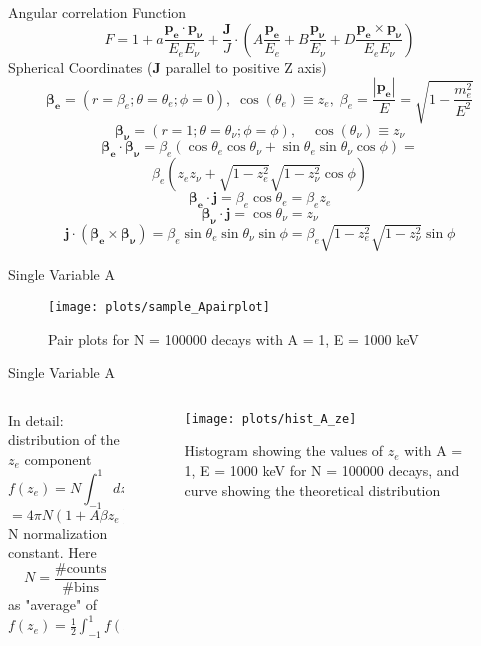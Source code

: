 \documentclass{beamer}
\begin{document}
\begin{frame}{Angular correlation Function}
	$$F = 1 + a \frac{\boldsymbol{p_e}\cdot\boldsymbol{p_\nu}}{E_eE_\nu} + \frac{\boldsymbol{J}}J\cdot\left(A \frac{\boldsymbol{p_e}}{E_e} + B \frac{\boldsymbol{p_\nu}}{E_\nu} + D \frac{\boldsymbol{p_e}\times\boldsymbol{p_\nu}}{E_eE_\nu}\right)$$
	Spherical Coordinates ($\boldsymbol{J}$ parallel to positive Z axis)
	$$\boldsymbol{\beta_e} = (r=\beta_e;\theta=\theta_e;\phi=0),\;\cos(\theta_e) \equiv z_e,\;\beta_e = \frac{|\boldsymbol{p_e}|}{E} = \sqrt{1-\frac{m_e^2}{E^2}}$$
	$$\boldsymbol{\beta_\nu} = (r=1;\theta=\theta_\nu;\phi=\phi),\quad\cos(\theta_\nu) \equiv z_\nu$$
	$$\boldsymbol{\beta_e}\cdot\boldsymbol{\beta_\nu} = \beta_e(\cos\theta_e\cos\theta_\nu + \sin\theta_e\sin\theta_\nu\cos\phi) =$$
	$$ \beta_e(z_ez_\nu + \sqrt{1-z^2_e}\sqrt{1-z^2_\nu}\cos\phi)$$
	$$\boldsymbol{\beta_e}\cdot\boldsymbol{j} = \beta_e\cos\theta_e=\beta_ez_e$$
	$$\boldsymbol{\beta_\nu}\cdot\boldsymbol{j} = \cos\theta_\nu=z_\nu$$
	$$\boldsymbol{j}\cdot(\boldsymbol{\beta_e}\times\boldsymbol{\beta_\nu})=\beta_e\sin\theta_e\sin\theta_\nu\sin\phi=\beta_e\sqrt{1-z^2_e}\sqrt{1-z^2_\nu}\sin\phi$$
\end{frame}	
\begin{frame}{Single Variable A}
	\begin{figure}
		\centering
		\texttt{[image: plots/sample\_Apairplot]}
		\caption{Pair plots for N = 100000 decays with A = 1, E = 1000 keV}
	\end{figure}
\end{frame}
\begin{frame}{Single Variable A}
	\begin{columns}
		\begin{column}{0.425\textwidth}
			In detail: distribution of the $z_e$ component
			$$f(z_e) = N\int_{-1}^{1}dz_\nu\int_{0}^{2\pi}d\phi F = $$$$= 4\pi N (1+A\beta z_e) = N(1+A\beta z_e)$$
			N normalization constant. Here 
			$$N =  \frac{\# \text{counts}}{\# \text{bins}}$$ 
			as "average" of $f(z_e) = \frac 12 \int_{-1}^1 f(z_e)dz_e = N$

		\end{column}
		\begin{column}{0.575\textwidth}
			\begin{figure}
				\centering
				\texttt{[image: plots/hist\_A\_ze]}
				\caption{Histogram showing the values of $z_e$ with A = 1, E = 1000 keV for N = 100000 decays, and curve showing the theoretical distribution}
			\end{figure}
		\end{column}
	\end{columns}
\end{frame}
\end{document}
